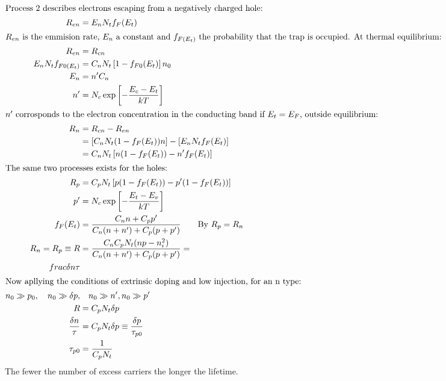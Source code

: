 \begin{columns}
{\begin{align*}
        \intertext{Process 2 describes electrons escaping from a negatively charged hole:}
        R_{en}&=E_nN_tf_{F}(E_t)\\
        \intertext{$R_{en}$ is the emmision rate, $E_n$ a constant and $f_{F(E_t)}$ the probability that the trap is occupied. At thermal equilibrium:}
        R_{en}&=R_{cn}\\
        E_nN_tf_{F0(E_t)}&=C_nN_t\left[ 1-f_{F0}(E_t) \right]n_0\\
        E_n&=n'C_n\\
        n'&=N_c\exp\left[ -\frac{E_c-E_t}{kT} \right]\\
        \intertext{$n'$ corrosponds to  the electron concentration in the conducting band if $E_t=E_F$, outside equilibrium:}
        R_n&=R_{cn}-R_{en}\\
        &=\left[ C_nN_t(1-f_{F}(E_t))n \right]-\left[ E_nN_tf_F(E_t) \right]\\
        &=C_nN_t\left[ n(1-f_F(E_t))-n'f_F(E_t) \right]\\
        \intertext{The same two processes exists for the holes:}
        R_p&=C_pN_t\left[ p(1-f_F(E_t))-p'(1-f_F(E_t)) \right]\\
        p'&=N_c\exp\left[ -\frac{E_t-E_v}{kT} \right]\\
        f_F(E_t)&=\frac{C_nn+C_pp'}{C_n(n+n')+C_p(p+p')}\qquad \textup{By $R_p=R_n$}\\
        R_n=R_p\equiv R &=\frac{C_nC_pN_t(np-n_i^2)}{C_n(n+n')+C_p(p+p')}=\\frac{\delta n}{\tau}\\
        \intertext{Now apllying the conditions of extrinsic doping and low injection, for an n type:}
        n_0\gg p_0,\quad n_0\gg \delta p,&\quad n_0\gg n', n_0\gg p'\\
        R &=C_pN_t\delta p\\
        \frac{\delta n}{\tau}&=C_pN_t\delta p\equiv \frac{\delta p}{\tau_{p0}}\\
        \tau_{p0}&=\frac{1}{C_pN_t}
\end{align*}
The fewer the number of excess carriers the longer the lifetime.}


\end{columns}
